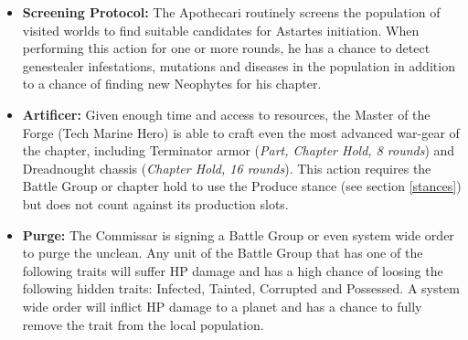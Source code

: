 \begin{itemize}
\begin{itemize}
		\item \textbf{Screening Protocol:} The Apothecari routinely screens the population of visited worlds to find suitable candidates for Astartes initiation. When performing this action for one or more rounds, he has a chance to detect genestealer infestations, mutations and diseases in the population in addition to a chance of finding new Neophytes for his chapter.
		\item \textbf{Artificer:} Given enough time and access to resources, the Master of the Forge (Tech Marine Hero) is able to craft even the most advanced war-gear of the chapter, including Terminator armor (\textit{Part, Chapter Hold, 8 rounds}) and Dreadnought chassis (\textit{Chapter Hold, 16 rounds}). This action requires the Battle Group or chapter hold to use the Produce stance (see section \ref{stances}) but does not count against its production slots.
		\item \textbf{Purge:} The Commissar is signing a Battle Group or even system wide order to purge the unclean. Any unit of the Battle Group that has one of the following traits will suffer HP damage and has a high chance of loosing the following hidden traits: Infected, Tainted, Corrupted and Possessed. A system wide order will inflict HP damage to a planet and has a chance to fully remove the trait from the local population.
	\end{itemize}
\end{itemize}

